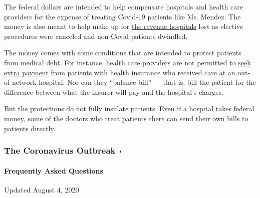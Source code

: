 The federal dollars are intended to help compensate hospitals and health
care providers for the expense of treating Covid-19 patients like Ms.
Mendez. The money is also meant to help make up for
\href{https://www.hhs.gov/coronavirus/cares-act-provider-relief-fund/index.html\#collapseTwo}{the
revenue hospitals} lost as elective procedures were canceled and
non-Covid patients dwindled.

The money comes with some conditions that are intended to protect
patients from medical debt. For instance, health care providers are not
permitted to
\href{https://www.hhs.gov/sites/default/files/provider-relief-fund-general-distribution-faqs.pdf}{seek
extra payment} from patients with health insurance who received care at
an out-of-network hospital. Nor can they ``balance-bill'' --- that is,
bill the patient for the difference between what the insurer will pay
and the hospital's charges.

But the protections do not fully insulate patients. Even if a hospital
takes federal money, some of the doctors who treat patients there can
send their own bills to patients directly.

\href{https://www.nytimes.com/news-event/coronavirus?action=click\&pgtype=Article\&state=default\&region=MAIN_CONTENT_3\&context=storylines_faq}{}

\hypertarget{the-coronavirus-outbreak-}{%
\subsubsection{The Coronavirus Outbreak
›}\label{the-coronavirus-outbreak-}}

\hypertarget{frequently-asked-questions}{%
\paragraph{Frequently Asked
Questions}\label{frequently-asked-questions}}

Updated August 4, 2020

